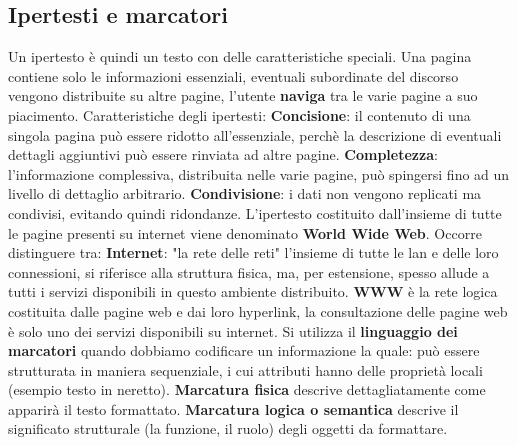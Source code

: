 \documentclass{article}
\begin{document}
\subsection{Ipertesti e marcatori}
Un ipertesto è quindi un testo con delle caratteristiche speciali. Una pagina contiene solo le informazioni essenziali, eventuali subordinate del discorso vengono distribuite su altre pagine, l'utente \textbf{naviga} tra le varie pagine a suo piacimento. Caratteristiche degli ipertesti:
\textbf{Concisione}: il contenuto di una singola pagina può essere ridotto all'essenziale, perchè la descrizione di eventuali dettagli aggiuntivi può essere rinviata ad altre pagine. \textbf{Completezza}: l'informazione complessiva, distribuita nelle varie pagine, può spingersi fino ad un livello di dettaglio arbitrario. \textbf{Condivisione}: i dati non vengono replicati ma condivisi, evitando quindi ridondanze. L'ipertesto costituito dall'insieme di tutte le pagine presenti su internet viene denominato \textbf{World Wide Web}. Occorre distinguere tra: \textbf{Internet}: "la rete delle reti" l'insieme di tutte le lan e delle loro connessioni, si riferisce alla struttura fisica, ma, per estensione, spesso allude a tutti i servizi disponibili in questo ambiente distribuito. \textbf{WWW} è la rete logica costituita dalle pagine web e dai loro hyperlink, la consultazione delle pagine web è solo uno dei servizi disponibili su internet. Si utilizza il \textbf{linguaggio dei marcatori} quando dobbiamo codificare un informazione la quale: può essere strutturata in maniera sequenziale, i cui attributi hanno delle proprietà locali (esempio testo in neretto). \textbf{Marcatura fisica} descrive dettagliatamente come apparirà il testo formattato. \textbf{Marcatura logica o semantica} descrive il significato strutturale (la funzione, il ruolo) degli oggetti da formattare. 
\end{document}
